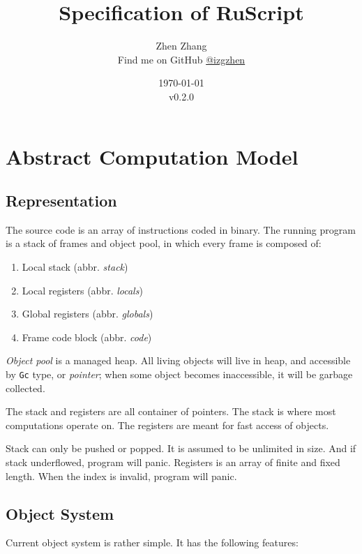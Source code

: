 \documentclass[]{article}
\title{Specification of RuScript}
\date{\today \\ v0.2.0}
\author{Zhen Zhang \\ Find me on GitHub \href{https://github.com/izgzhen}{@izgzhen}}
\numberwithin{equation}{section}
\numberwithin{figure}{section}
\numberwithin{table}{section}
\begin{document}
\maketitle

\newpage

\tableofcontents

\newpage

\section{Abstract Computation Model}\label{abstract-computation-model}

\subsection{Representation}\label{representation}

The source code is an array of instructions coded in binary. The running
program is a stack of frames and object pool, in which every frame is
composed of:

\begin{enumerate}
\def\labelenumi{\arabic{enumi}.}
\itemsep1pt\parskip0pt
\item
  Local stack (abbr. \emph{stack})
\item
  Local registers (abbr. \emph{locals})
\item
  Global registers (abbr. \emph{globals})
\item
  Frame code block (abbr. \emph{code})
\end{enumerate}

\emph{Object pool} is a managed heap. All living objects will live in
heap, and accessible by \texttt{Gc} type, or \emph{pointer}; when some
object becomes inaccessible, it will be garbage collected.

The stack and registers are all container of pointers. The stack is
where most computations operate on. The registers are meant for fast access of objects.

Stack can only be pushed or popped. It is assumed to
be unlimited in size. And if stack underflowed, program will
panic. Registers is an array of finite and fixed length. When the index is
invalid, program will panic.

\subsection{Object System}\label{object-system}

Current object system is rather simple. It has the following features:
\end{document}
